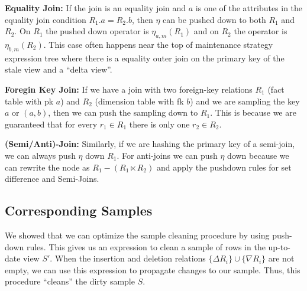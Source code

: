 \vspace{.25em}

{\noindent \textbf{Equality Join:}} If the join is an equality join and $a$ is one of the attributes in the equality join condition $R_1.a = R_2.b$, then $\eta$ can be pushed down to both $R_1$ and $R_2$. On $R_1$ the pushed down operator is $\eta_{a, m}(R_1)$ and on $R_2$ the operator is $\eta_{b, m}(R_2)$. This case often happens near the top of maintenance strategy expression tree where there is a equality outer join on the primary key of the stale view and a ``delta view''.

\vspace{.25em}

{\noindent \textbf{Foregin Key Join:}} If we have a join with two foreign-key relations $R_1$ (fact table with pk $a$) and $R_2$ (dimension table with fk $b$) and we are sampling the key $a$ or $(a,b)$, then we can push the sampling down to $R_1$. This is because we are guaranteed that for every $r_1\in R_1$ there is only one $r_2 \in R_2$.


\vspace{.25em}

{\noindent \textbf{(Semi/Anti)-Join:}} Similarly, if we are hashing the primary key of a semi-join, we can always push $\eta$ down $R_1$. For anti-joins we can push $\eta$ down because we can rewrite the node as $R_1 - (R_1 \ltimes R_2) $ and apply the pushdown rules for set difference and Semi-Joins.

\subsection{Corresponding Samples}
We showed that we can optimize the sample cleaning procedure by using push-down rules.
This gives us an expression to clean a sample of rows in the up-to-date view $S'$.
When the insertion and deletion relations $\{\Delta R_i\} \cup \{\nabla R_i\}$ are not empty, we can use
this expression to propagate changes to our sample.
Thus, this procedure ``cleans'' the dirty sample $S$.

